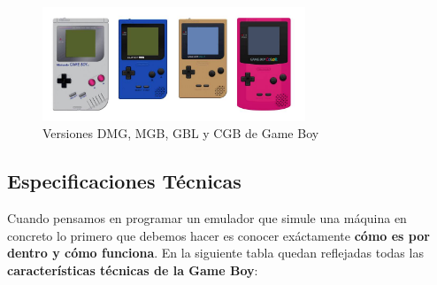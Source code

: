 \begin{figure}[H]
\centering
\includegraphics[width=0.7\textwidth]{include/images/gbs.jpg}
\caption{Versiones DMG, MGB, GBL y CGB de Game Boy}
\label{figure:v_gameboy}
\end{figure}

\subsection{Especificaciones Técnicas}

Cuando pensamos en programar un emulador que simule una máquina en concreto lo primero que debemos hacer es conocer exáctamente \textbf{cómo es por dentro y cómo funciona}. En la siguiente tabla quedan reflejadas todas las \textbf{características técnicas de la Game Boy}: \\

